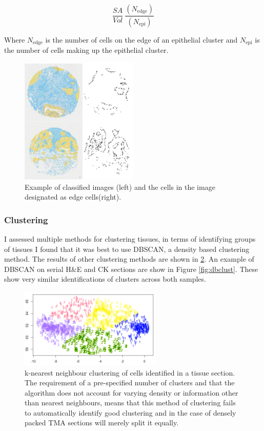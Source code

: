 \[\frac{SA}{Vol} ~ \frac{(N_{\mathrm{edge}})} {(N_{\mathrm{epi}})}\]

Where $N_{\mathrm{edge}}$ is the number of cells on the edge of an epithelial cluster and $N_{\mathrm{epi}}$ is the number of cells making up the epithelial cluster.

\begin{figure}
    \centering
    \includegraphics[width=0.5\textwidth]{Chapter3/Figs/Thesis-08.png}
    \caption{Example of classified images (left) and the cells in the image designated as edge cells(right).}
    \label{fig:edge_cells}
\end{figure}

\subsubsection*{Clustering}
I assessed multiple methods for clustering tissues, in terms of identifying groups of tissues I found that it was best to use DBSCAN, a density based clustering method. The results of other clustering methods are shown in \ref{fig:clust_bad}. An example of DBSCAN on serial H\&E and CK sections are show in Figure \ref{fig:dbclust}. These show very similar identifications of clusters across both samples.

\begin{figure}
    \centering
    \includegraphics{Chapter3/Figs/knn_example_2.png}
    \caption[k-nearest neighbour clustering of cells]{k-nearest neighbour clustering of cells identified in a tissue section. The requirement of a pre-specified number of clusters and that the algorithm does not account for varying density or information other than nearest neighbours, means that this method of clustering fails to automatically identify good clustering and in the case of densely packed TMA sections will merely split it equally.}
    \label{fig:clust_bad}
\end{figure}

